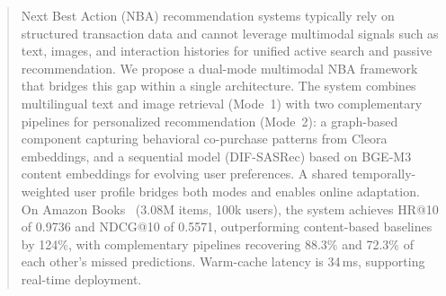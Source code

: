 \begin{abstract}
Next Best Action (NBA) recommendation systems typically rely on structured transaction data and cannot leverage multimodal signals such as text, images, and interaction histories for unified active search and passive recommendation. We propose a dual-mode multimodal NBA framework that bridges this gap within a single architecture. The system combines multilingual text and image retrieval (Mode~1) with two complementary pipelines for personalized recommendation (Mode~2): a graph-based component capturing behavioral co-purchase patterns from Cleora embeddings, and a sequential model (DIF-SASRec) based on BGE-M3 content embeddings for evolving user preferences. A shared temporally-weighted user profile bridges both modes and enables online adaptation. On Amazon Books~\cite{hou2024amazon} (3.08M items, 100k users), the system achieves HR@10 of 0.9736 and NDCG@10 of 0.5571, outperforming content-based baselines by 124\%, with complementary pipelines recovering 88.3\% and 72.3\% of each other's missed predictions. Warm-cache latency is 34\,ms, supporting real-time deployment.
\end{abstract}

